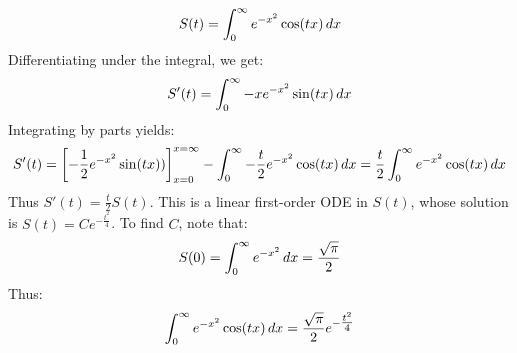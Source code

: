 \documentclass[main.tex]{subfiles}
\begin{document}
\begin{example}
    \begin{equation*}
        S(t) = \int_0^\infty e^{-x^2}\cos(tx)\,dx
    \end{equation*}
    Differentiating under the integral, we get:
    \begin{equation*}
        S'(t) = \int_0^\infty -xe^{-x^2}\sin(tx)\,dx
    \end{equation*}
    Integrating by parts yields:
    \begin{equation*}
        S'(t)
        = \qty[-\frac{1}{2}e^{-x^2}\sin(tx))]_{x=0}^{x=\infty}
        - \int_0^\infty -\frac{t}{2}e^{-x^2}\cos(tx)\,dx
        = \frac{t}{2}\int_0^\infty e^{-x^2}\cos(tx)\,dx
    \end{equation*}
    Thus $S'(t)=\frac{t}{2}S(t)$. This is a linear first-order ODE in $S(t)$, whose solution is $S(t)=Ce^{-\tfrac{t^2}{4}}$. To find $C$, note that:
    \begin{equation*}
        S(0) = \int_0^\infty e^{-x^2}\,dx = \frac{\sqrt{\pi}}{2}
    \end{equation*}
    Thus:
    \begin{equation*}
        \int_0^\infty e^{-x^2}\cos(tx)\,dx = \frac{\sqrt{\pi}}{2}e^{-\tfrac{t^2}{4}}
    \end{equation*}
\end{example}
\end{document}
